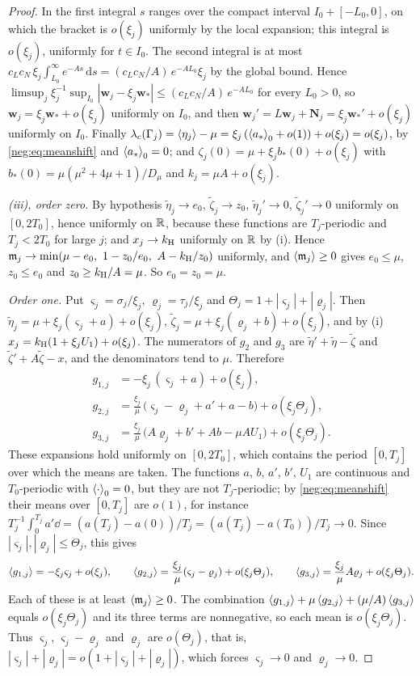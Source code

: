\begin{proof}
In the first integral $s$ ranges over the compact interval $I_0+[-L_0,0]$, on which the bracket is $o(\xi_j)$ uniformly by the local expansion; this integral is $o(\xi_j)$, uniformly for $t\in I_0$. The second integral is at most $c_Lc_N\,\xi_j\int_{L_0}^\infty e^{-As}\,\mathrm ds=(c_Lc_N/A)\,e^{-AL_0}\xi_j$ by the global bound. Hence $\limsup_j\xi_j^{-1}\sup_{I_0}|\mathbf w_j-\xi_j\mathbf w_*|\le(c_Lc_N/A)\,e^{-AL_0}$ for every $L_0>0$, so $\mathbf w_j=\xi_j\mathbf w_*+o(\xi_j)$ uniformly on $I_0$, and then $\mathbf w_j'=L\mathbf w_j+\mathbf N_j=\xi_j\mathbf w_*'+o(\xi_j)$ uniformly on $I_0$. Finally $\lambda_c(\Gamma_j)=\left\langle \eta_j\right\rangle-\mu=\xi_j\,(\left\langle a_*\right\rangle_0+o(1))+o(\xi_j)=o(\xi_j)$, by \eqref{neg:eq:meanshift} and $\left\langle a_*\right\rangle_0=0$; and $\zeta_j(0)=\mu+\xi_jb_*(0)+o(\xi_j)$ with $b_*(0)=\mu(\mu^2+4\mu+1)/D_\mu$ and $k_j=\mu A+o(\xi_j)$.

\emph{(iii), order zero.} By hypothesis $\tilde\eta_j\to e_0$, $\tilde\zeta_j\to z_0$, $\tilde\eta_j'\to0$, $\tilde\zeta_j'\to0$ uniformly on $[0,2T_0]$, hence uniformly on $\mathbb R$, because these functions are $T_j$-periodic and $T_j<2T_0$ for large $j$; and $x_j\to k_{\mathrm H}$ uniformly on $\mathbb R$ by (i). Hence $\mathfrak m_j\to\min(\mu-e_0,\ 1-z_0/e_0,\ A-\kH/z_0)$ uniformly, and $\left\langle \mathfrak m_j\right\rangle\ge0$ gives $e_0\le\mu$, $z_0\le e_0$ and $z_0\ge k_{\mathrm H}/A=\mu$. So $e_0=z_0=\mu$.

\emph{Order one.} Put $\varsigma_j=\sigma_j/\xi_j$, $\varrho_j=\tau_j/\xi_j$ and $\Theta_j=1+|\varsigma_j|+|\varrho_j|$. Then $\tilde\eta_j=\mu+\xi_j(\varsigma_j+a)+o(\xi_j)$, $\tilde\zeta_j=\mu+\xi_j(\varrho_j+b)+o(\xi_j)$, and by (i) $x_j=k_{\mathrm H}(1+\xi_jU_1)+o(\xi_j)$. The numerators of $g_2$ and $g_3$ are $\tilde\eta'+\tilde\eta-\tilde\zeta$ and $\tilde\zeta'+A\tilde\zeta-x$, and the denominators tend to $\mu$. Therefore
\begin{align*}
g_{1,j}&=-\xi_j\,(\varsigma_j+a)+o(\xi_j),\\
g_{2,j}&=\frac{\xi_j}{\mu}\,\bigl(\varsigma_j-\varrho_j+a'+a-b\bigr)+o(\xi_j\Theta_j),\\
g_{3,j}&=\frac{\xi_j}{\mu}\,\bigl(A\varrho_j+b'+Ab-\mu AU_1\bigr)+o(\xi_j\Theta_j).
\end{align*}
These expansions hold uniformly on $[0,2T_0]$, which contains the period $[0,T_j]$ over which the means are taken. The functions $a$, $b$, $a'$, $b'$, $U_1$ are continuous and $T_0$-periodic with $\left\langle \cdot\right\rangle_0=0$, but they are not $T_j$-periodic; by \eqref{neg:eq:meanshift} their means over $[0,T_j]$ are $o(1)$, for instance $T_j^{-1}\int_0^{T_j}a'\dd=(a(T_j)-a(0))/T_j=(a(T_j)-a(T_0))/T_j\to0$. Since $|\varsigma_j|,|\varrho_j|\le\Theta_j$, this gives
\[
\left\langle g_{1,j}\right\rangle=-\xi_j\varsigma_j+o(\xi_j),\qquad
\left\langle g_{2,j}\right\rangle=\frac{\xi_j}{\mu}(\varsigma_j-\varrho_j)+o(\xi_j\Theta_j),\qquad
\left\langle g_{3,j}\right\rangle=\frac{\xi_j}{\mu}A\varrho_j+o(\xi_j\Theta_j).
\]
Each of these is at least $\left\langle \mathfrak m_j\right\rangle\ge0$. The combination $\left\langle g_{1,j}\right\rangle+\mu\left\langle g_{2,j}\right\rangle+(\mu/A)\left\langle g_{3,j}\right\rangle$ equals $o(\xi_j\Theta_j)$ and its three terms are nonnegative, so each mean is $o(\xi_j\Theta_j)$. Thus $\varsigma_j$, $\varsigma_j-\varrho_j$ and $\varrho_j$ are $o(\Theta_j)$, that is, $|\varsigma_j|+|\varrho_j|=o(1+|\varsigma_j|+|\varrho_j|)$, which forces $\varsigma_j\to0$ and $\varrho_j\to0$.


\end{proof}
